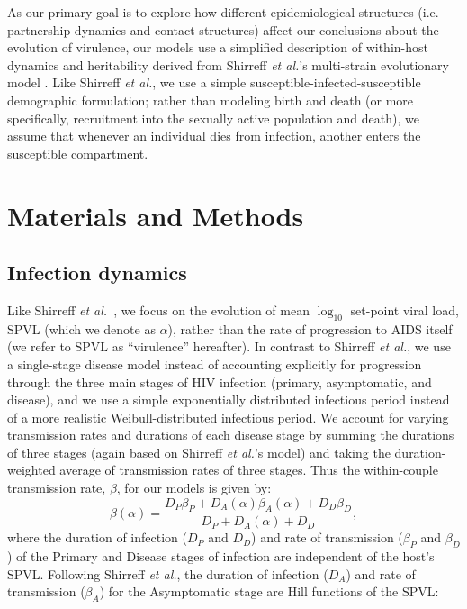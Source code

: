 \documentclass[10pt,letterpaper]{article}
\newcommand{\etal}{\textit{et al.}}
\begin{document}
As our primary goal is to explore how different epidemiological
structures (i.e. partnership dynamics and contact structures) affect
our conclusions about the evolution of virulence, our models use a
simplified description of within-host dynamics and heritability
derived from Shirreff \etal's multi-strain evolutionary model
\cite{shirreff_transmission_2011}. Like Shirreff \etal, we use a
simple susceptible-infected-susceptible demographic formulation;
rather than modeling birth and death (or more specifically,
recruitment into the sexually active population and death), we assume
that whenever an individual dies from infection, another enters the
susceptible compartment.

\section*{Materials and Methods}

\subsection*{Infection dynamics}

Like Shirreff \etal\ \cite{shirreff_transmission_2011}, we focus on the evolution of mean $\log_{10}$ set-point viral load, SPVL (which we denote as $\alpha$), rather than the rate of progression to AIDS itself
(we refer to SPVL as ``virulence'' hereafter).
In contrast to Shirreff \etal, we use a single-stage disease model instead of accounting explicitly for progression through the three main stages of HIV infection (primary, asymptomatic, and disease), and we use a simple exponentially distributed infectious period instead of a more realistic Weibull-distributed infectious period. We account for varying transmission rates and durations of each disease stage by summing the durations of three stages (again based on Shirreff \etal's model) and taking the duration-weighted average of transmission rates of three stages. Thus the within-couple transmission rate, $\beta$, for our models is given by:
\begin{equation}
\beta (\alpha) = \frac{D_P \beta_P + D_A (\alpha) \beta_A (\alpha) + D_D \beta_D}{D_P + D_A (\alpha) + D_D},
\end{equation}
where the duration of infection ($D_P$ and $D_D$) and rate of transmission ($\beta_P$ and $\beta_D$) of the Primary and Disease stages
of infection are independent of the host's SPVL. Following Shirreff \etal, the duration of infection ($D_A$) and rate of transmission ($\beta_A$) for the Asymptomatic stage are Hill functions of the SPVL:
\end{document}
